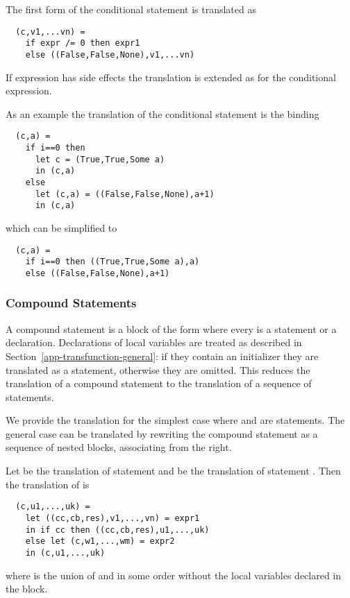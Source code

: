 The first form of the conditional statement is translated as
\begin{verbatim}
  (c,v1,...vn) =
    if expr /= 0 then expr1
    else ((False,False,None),v1,...vn)
\end{verbatim}

If expression  has side effects the translation is extended as for the conditional expression.

As an example the translation of the conditional statement  is the binding
\begin{verbatim}
  (c,a) =
    if i==0 then 
      let c = (True,True,Some a)
      in (c,a)
    else
      let (c,a) = ((False,False,None),a+1)
      in (c,a)
\end{verbatim}
which can be simplified to
\begin{verbatim}
  (c,a) =
    if i==0 then ((True,True,Some a),a)
    else ((False,False,None),a+1)
\end{verbatim}

\subsubsection{Compound Statements}

A compound statement is a block of the form  where every  is a statement or a declaration.
Declarations of local variables are treated as described in Section~\ref{app-transfunction-general}: if they contain an
initializer they are translated as a statement, otherwise they are omitted. This reduces the translation of a compound
statement to the translation of a sequence of statements.

We provide the translation for the simplest case  where  and  are statements.
The general case can be translated by rewriting the compound statement as a sequence of nested blocks, associating
from the right.

Let  be the translation of statement  and  
be the translation of statement . Then the translation of
 is
\begin{verbatim}
  (c,u1,...,uk) =
    let ((cc,cb,res),v1,...,vn) = expr1
    in if cc then ((cc,cb,res),u1,...,uk)
    else let (c,w1,...,wm) = expr2
    in (c,u1,...,uk)
\end{verbatim}
where  is the union of  and  in some order without the local variables 
declared in the block.

